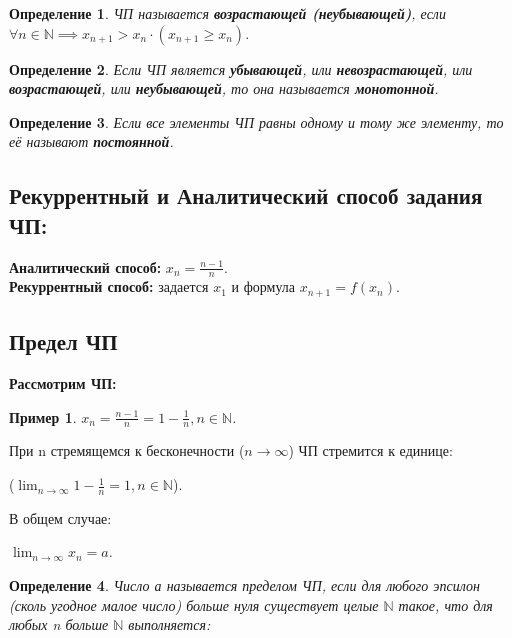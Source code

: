 \documentclass[12pt, a4paper]{article}
\newtheorem{definition}{Определение}[subsection]
\newtheorem{example}{Пример}[subsection]
\theoremstyle{remark}
\newcommand{\N}{\mathbb{N}}
\newcommand{\Y}{\mathbb{\forall}}
\begin{document}
	\begin{definition}
		ЧП называется \textbf{возрастающей (неубывающей)}, если $\Y n \in \N \implies x_{n+1} > x_n \cdot (x_{n+1} \geq x_n)$.
	\end{definition}
	
	\begin{definition}
		Если ЧП является \textbf{убывающей}, или \textbf{невозрастающей}, или \textbf{возрастающей}, или \textbf{неубывающей}, то она называется \textbf{монотонной}.
	\end{definition}
	
	\begin{definition}
		Если все элементы ЧП равны одному и тому же элементу, то её называют \textbf{постоянной}.
	\end{definition}
	
	\subsection{Рекуррентный и Аналитический способ задания ЧП:}
	
	\textbf{Аналитический способ:} \(x_n = \frac{n-1}{n}\). \\
	\textbf{Рекуррентный способ:} задается \(x_1\) и формула \(x_{n+1} = f(x_n)\).
	
	\subsection{Предел ЧП}
	
	\textbf{Рассмотрим ЧП:}
	
	\begin{example}
		$x_n = \frac{n-1}{n} = 1 - \frac{1}{n}, n \in \N$.
	\end{example}
	
	При n стремящемся к бесконечности ($n \to \infty$) ЧП стремится к единице:
	\begin{center}
		($\lim_{n \to \infty} 1 - \frac{1}{n} = 1, n \in \N$).
	\end{center}
	
	В общем случае: 
	\begin{center}
		$\lim_{n \to \infty} x_n = a$.
	\end{center}
	
	\begin{definition}
		Число а называется пределом ЧП, если для любого эпсилон (сколь угодное малое число) больше 	нуля существует целые $\N$ такое, что для любых n больше $\N$ выполняется: 
	\end{definition}
	
\end{document}

